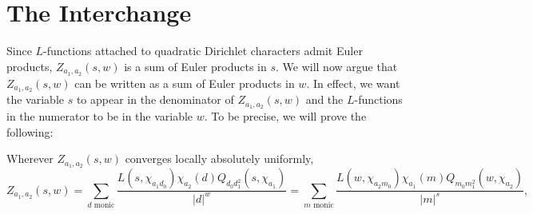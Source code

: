 \documentclass[12pt,reqno,oneside]{amsart}
\begin{document}
\section{The Interchange}
    Since $L$-functions attached to quadratic Dirichlet characters admit Euler products, $Z_{a_{1},a_{2}}(s,w)$ is a sum of Euler products in $s$. We will now argue that $Z_{a_{1},a_{2}}(s,w)$ can be written as a sum of Euler products in $w$. In effect, we want the variable $s$ to appear in the denominator of $Z_{a_{1},a_{2}}(s,w)$ and the $L$-functions in the numerator to be in the variable $w$. To be precise, we will prove the following:

    \begin{theorem}[Interchange]
        Wherever $Z_{a_{1},a_{2}}(s,w)$ converges locally absolutely uniformly,
        \[
            Z_{a_{1},a_{2}}(s,w) = \sum_{\text{$d$ monic}}\frac{L(s,\chi_{a_{1}d_{0}})\chi_{a_{2}}(d)Q_{d_{0}d_{1}^{2}}(s,\chi_{a_{1}})}{|d|^{w}} = \sum_{\text{$m$ monic}}\frac{L(w,\chi_{a_{2}m_{0}})\chi_{a_{1}}(m)Q_{m_{0}m_{1}^{2}}(w,\chi_{a_{2}})}{|m|^{s}},
        \]
    \end{theorem}
\end{document}

